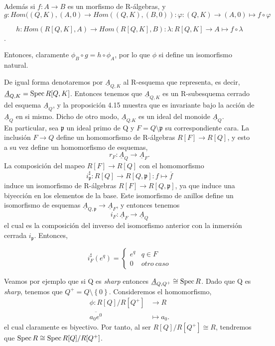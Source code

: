 \documentclass[12pt,spanish]{amsart}
\newcommand{\fk}[1]{\mathfrak{#1}}
\newcommand{\set}[1]{\left\{{#1}\right\}}
\def\Spec{\mathop{\mbox{\normalfont Spec}}\nolimits}
\theoremstyle{definition}
\theoremstyle{remark}
\begin{document}
Además si $f:A \to B$ es un morfismo de R-álgebras, y $$g:Hom((Q,K),(A,0) \to Hom((Q,K),(B,0)):\varphi:(Q,K) \to (A,0) \mapsto f \circ \varphi$$ 

$$h:Hom(R[Q,K],A) \to Hom(R[Q,K],B): \lambda:R[Q,K] \to A \mapsto f\circ \lambda$$. 

Entonces, claramente $\phi_{B} \circ g=h\circ \phi_{A}$, por lo que $\phi$ si define un isomorfismo natural. 


De igual forma denotaremos por $\underline{A}_{Q,K}$ al R-esquema que representa, es decir, $\underline{A}_{Q,K}=\Spec{R[Q,K]}$. Entonces tenemos que $\underline{A}_{Q,K}$ es un R-subesquema cerrado del esquema $\underline{A}_{Q}$, y la proposición 4.15 muestra que es invariante bajo la acción de $\underline{A}_{Q}$ en si mismo. Dicho de otro modo, $\underline{A}_{Q.K}$ es un ideal del monoide $\underline{A}_{Q}$. \\
En particular, sea $\fk{p}$ un ideal primo de Q y $F=Q\setminus \fk{p}$ su correspondiente cara. La inclusión $F \to Q$ define un homomorfismo de R-álgebras $R[F] \to R[Q]$, y esto a su vez define un homomorfismo de esquemas,
$$r_{F}:\underline{A}_{Q} \to \underline{A}_{F}.$$
La composición del mapeo $R[F] \to R[Q]$ con el homomorfismo 
$$i_{\fk{p}}^{\sharp}:R[Q] \to R[Q,\fk{p}]:f \mapsto \overline{f}$$
induce un isomorfismo de R-álgebras $R[F]\to R[Q,\fk{p}]$, ya que induce una biyección en los elementos de la base. Este isomorfismo de anillos define un isomorfismo de esquemas $\underline{A}_{Q,\fk{p}} \to \underline{A}_{F}$, y entonces tenemos 
$$i_{F}:\underline{A}_{F} \to \underline{A}_{Q}$$
el cual es la composición del inverso del isomorfismo anterior con la inmersión cerrada $i_{\fk{p}}$. Entonces,

\[ 
i_{F}^{\sharp}(e^{q})=
\begin{cases} 
      e^{q} & q\in F \\
      0 & otro~caso 
   \end{cases}
\]

Veamos por ejemplo que si Q es \textit{sharp} entonces $\underline{A}_{Q,Q^{+}}\cong \Spec{R}$. Dado que Q es \textit{sharp}, tenemos que $Q^{+}=Q\setminus \set{0}$. Consideremos el homomorfismo,
\begin{equation*}
\begin{split}
\phi:R[Q]/R[Q^{+}] &\to R \\
\overline{a_{0}e^{0}} &\mapsto a_{0}.
\end{split}
\end{equation*}
el cual claramente es biyectivo. Por tanto, al ser $R[Q]/R[Q^{+}] \cong R$, tendremos que $\Spec{R}\cong \Spec{R[Q]/R[Q^{+}]}$.
\end{document}
